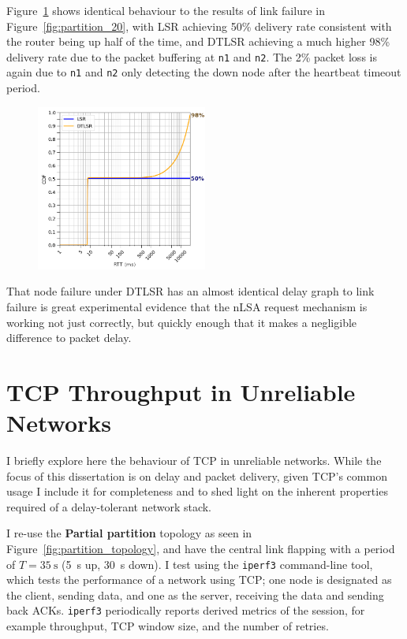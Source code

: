 \documentclass[withindex,glossary,openany]{cam-thesis}
\begin{document}
Figure~\ref{fig:delay_node_flap20} shows identical behaviour to the results of link failure in Figure~\ref{fig:partition_20}, with LSR achieving 50\% delivery rate consistent with the router being up half of the time, and DTLSR achieving a much higher 98\% delivery rate due to the packet buffering at \texttt{n1} and \texttt{n2}. The 2\% packet loss is again due to \texttt{n1} and \texttt{n2} only detecting the down node after the heartbeat timeout period.

\begin{figure}[h]
	\centering
	\includegraphics[width=0.5\textwidth]{delay_node_flap20}
	\label{fig:delay_node_flap20}
\end{figure}

That node failure under DTLSR has an almost identical delay graph to link failure is great experimental evidence that the nLSA request mechanism is working not just correctly, but quickly enough that it makes a negligible difference to packet delay.


\section{TCP Throughput in Unreliable Networks}
\label{sec:tcp}

I briefly explore here the behaviour of TCP in unreliable networks. While the focus of this dissertation is on delay and packet delivery, given TCP's common usage I include it for completeness and to shed light on the inherent properties required of a delay-tolerant network stack.

I re-use the \textbf{Partial partition} topology as seen in Figure~\ref{fig:partition_topology}, and have the central link flapping with a period of $T=\SI{35}{\s}$ (\SI{5}{\s} up, \SI{30}{\s} down). I test using the \texttt{iperf3} command-line tool\cite{IPERF}, which tests the performance of a network using TCP; one node is designated as the client, sending data, and one as the server, receiving the data and sending back ACKs. \texttt{iperf3} periodically reports derived metrics of the session, for example throughput, TCP window size, and the number of retries.
\end{document}
